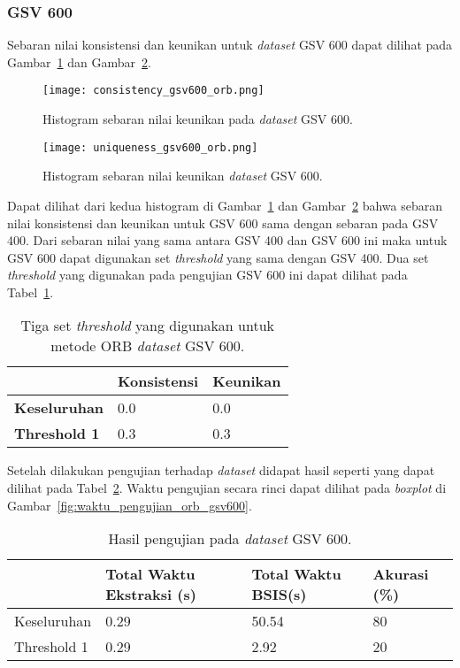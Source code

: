 \subsubsection{GSV 600}
Sebaran nilai konsistensi dan keunikan untuk \textit{dataset} GSV 600 dapat dilihat pada Gambar~\ref{fig:consistency_gsv600_pengujian_orb} dan Gambar~\ref{fig:uniqueness_gsv600_pengujian_orb}.
\begin{figure}[H]
	\centering
	\texttt{[image: consistency\_gsv600\_orb.png]}
	\caption{Histogram sebaran nilai keunikan pada \textit{dataset} GSV 600.}
	\label{fig:consistency_gsv600_pengujian_orb}
\end{figure}

\begin{figure}[H]
	\centering
	\texttt{[image: uniqueness\_gsv600\_orb.png]}
	\caption{Histogram sebaran nilai keunikan \textit{dataset} GSV 600.}
	\label{fig:uniqueness_gsv600_pengujian_orb}
\end{figure}
Dapat dilihat dari kedua histogram di Gambar~\ref{fig:consistency_gsv600_pengujian_orb} dan Gambar~\ref{fig:uniqueness_gsv600_pengujian_orb} bahwa sebaran nilai konsistensi dan keunikan untuk GSV 600 sama dengan sebaran pada GSV 400. Dari sebaran nilai yang sama antara GSV 400 dan GSV 600 ini maka untuk GSV 600 dapat digunakan set \textit{threshold} yang sama dengan GSV 400. Dua set \textit{threshold} yang digunakan pada pengujian GSV 600 ini dapat dilihat pada Tabel~\ref{tab:threshold_gsv600_orb}.
\begin{table}[H]
	\centering
	\begin{tabular}{|l|l|l|}
		\hline
		& \textbf{Konsistensi} & \textbf{Keunikan} \\ \hline
		\textbf{Keseluruhan} & 0.0                  & 0.0               \\ \hline
		\textbf{Threshold 1} & 0.3                  & 0.3               \\ \hline
	\end{tabular}
	\caption{Tiga set \textit{threshold} yang digunakan untuk metode ORB \textit{dataset} GSV 600.}
	\label{tab:threshold_gsv600_orb}
\end{table}
Setelah dilakukan pengujian terhadap \textit{dataset} didapat hasil seperti yang dapat dilihat pada Tabel~\ref{tab:pengujian_orb_gsv600}. Waktu pengujian secara rinci dapat dilihat pada \textit{boxplot} di Gambar~\ref{fig:waktu_pengujian_orb_gsv600}. 
\begin{table}[H]
	\centering
	\begin{tabular}{|l|l|l|l|}
		\hline
		& \textbf{Total Waktu Ekstraksi (s)} & \textbf{Total Waktu BSIS(s)} & \textbf{Akurasi (\%)} \\ \hline
		Keseluruhan & 0.29 & 50.54                   & 80                    \\ \hline
		Threshold 1 & 0.29 & 2.92                    & 20                    \\ \hline
	\end{tabular}
	\caption{Hasil pengujian pada \textit{dataset} GSV 600.}
	\label{tab:pengujian_orb_gsv600}
\end{table}
